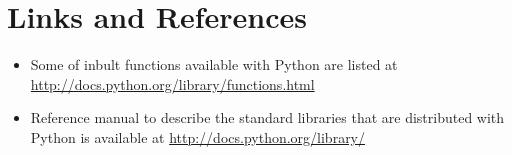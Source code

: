 \documentclass[12pt]{article}
\begin{document}
\section{Links and References}
\begin{itemize}
\item Some of inbult functions available with Python are listed at\\ \url{http://docs.python.org/library/functions.html}
\item Reference manual to describe the standard libraries  that are distributed with Python is available at \url{http://docs.python.org/library/} 
\end{itemize}
\end{document}
